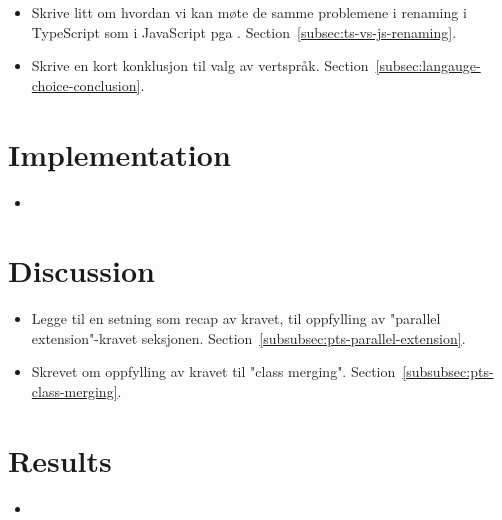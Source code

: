 \begin{itemize}
    \item Skrive litt om hvordan vi kan møte de samme problemene i renaming i TypeScript som i JavaScript pga .
    Section~\vref{subsec:ts-vs-js-renaming}.
    \item Skrive en kort konklusjon til valg av vertspråk.
    Section~\vref{subsec:langauge-choice-conclusion}.
\end{itemize}

\section*{Implementation}

\begin{itemize}
    \item
\end{itemize}

\section*{Discussion}

\begin{itemize}
    \item Legge til en setning som recap av kravet, til oppfylling av "parallel extension"-kravet seksjonen.
    Section~\vref{subsubsec:pts-parallel-extension}.
    \item Skrevet om oppfylling av kravet til "class merging".
    Section~\vref{subsubsec:pts-class-merging}.
\end{itemize}

\section*{Results}

\begin{itemize}
    \item
\end{itemize}
